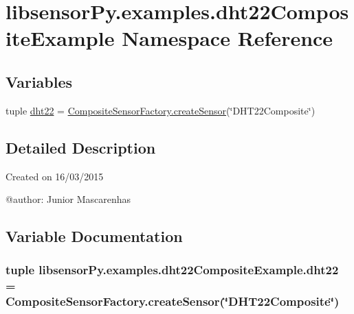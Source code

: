 \hypertarget{namespacelibsensorPy_1_1examples_1_1dht22CompositeExample}{}\section{libsensor\+Py.\+examples.\+dht22\+Composite\+Example Namespace Reference}
\label{namespacelibsensorPy_1_1examples_1_1dht22CompositeExample}
\subsection*{Variables}
\begin{DoxyCompactItemize}
\item 
tuple \hyperlink{namespacelibsensorPy_1_1examples_1_1dht22CompositeExample_a7303eaf02ea5ed75592659f0396eb0be}{dht22} = \hyperlink{classconcretefactory_1_1compositeSensorFactory_1_1CompositeSensorFactory_a2d3860525907a2f2d37c98163150ea03}{Composite\+Sensor\+Factory.\+create\+Sensor}(\char`\"{}D\+H\+T22\+Composite\char`\"{})
\end{DoxyCompactItemize}


\subsection{Detailed Description}
\begin{DoxyVerb}Created on 16/03/2015

@author: Junior Mascarenhas
\end{DoxyVerb}
 

\subsection{Variable Documentation}
\hypertarget{namespacelibsensorPy_1_1examples_1_1dht22CompositeExample_a7303eaf02ea5ed75592659f0396eb0be}{}
\subsubsection[{dht22}]{\setlength{\rightskip}{0pt plus 5cm}tuple libsensor\+Py.\+examples.\+dht22\+Composite\+Example.\+dht22 = {\bf Composite\+Sensor\+Factory.\+create\+Sensor}(\char`\"{}D\+H\+T22\+Composite\char`\"{})}\label{namespacelibsensorPy_1_1examples_1_1dht22CompositeExample_a7303eaf02ea5ed75592659f0396eb0be}
